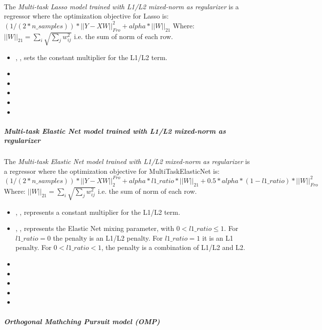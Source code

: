 \mbox{}
\\The \textit{Multi-task Lasso model trained with L1/L2 mixed-norm as
  regularizer} is a regressor where the optimization objective for Lasso is:
$(1 / (2 * n\_samples)) * ||Y - XW||^2_{Fro} + alpha * ||W||_{21}$
Where:
$||W||_{21} = \sum_i \sqrt{\sum_j w_{ij}^2}$
i.e. the sum of norm of each row.
%
\begin{itemize}
  \item {}, , sets the constant
  multiplier for the L1/L2 term.
  \item {}
  \item {}
  \item {}
  \item {}
  \item {}
\end{itemize}
\subparagraph{Multi-task Elastic Net model trained with L1/L2 mixed-norm as
  regularizer}
\mbox{}

The \textit{Multi-task Elastic Net model trained with L1/L2 mixed-norm as
  regularizer} is a regressor where the optimization objective for
MultiTaskElasticNet is:
$(1 / (2 * n\_samples)) * ||Y - XW||^{Fro}_2
+ alpha * l1\_ratio * ||W||_{21}
+ 0.5 * alpha * (1 - l1\_ratio) * ||W||_{Fro}^2$
Where:
$||W||_{21} = \sum_i \sqrt{\sum_j w_{ij}^2}$
i.e. the sum of norm of each row.
%
\begin{itemize}
  \item {}, , represents a constant
  multiplier for the L1/L2 term.
  \item {}, , represents the Elastic Net mixing
  parameter, with $0 < l1\_ratio \leq 1$.
  For $l1\_ratio = 0$ the penalty is an L1/L2 penalty.
  For $l1\_ratio = 1$ it is an L1 penalty.
  For $0 < l1\_ratio < 1$, the penalty is a combination of L1/L2
  and L2.
  \item {}
  \item {}
  \item \maxIterDescription{}
  \item {}
  \item {}
\end{itemize}
\subparagraph{Orthogonal Mathching Pursuit model (OMP)}
\mbox{}


